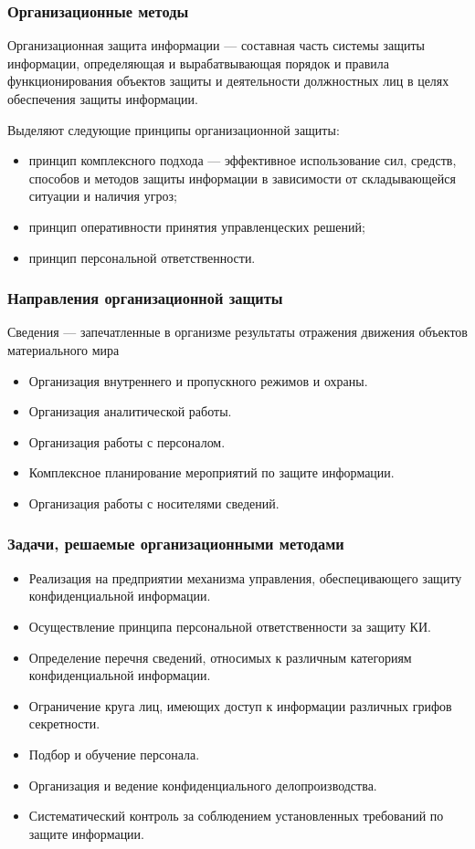 \begin{frame}
\frametitle{Организационные методы}
\begin{definition}%
\alert{Организационная защита информации} --- составная часть системы защиты информации, определяющая и вырабатвывающая порядок и правила функционирования объектов защиты и деятельности должностных лиц в целях обеспечения защиты информации.
\end{definition}
Выделяют следующие принципы организационной защиты:
\begin{itemize}
    \item принцип комплексного подхода --- эффективное использование сил, средств, способов и методов защиты информации в зависимости от складывающейся ситуации и наличия угроз;
    \item принцип оперативности принятия управленцеских решений;
    \item принцип персональной ответственности.
\end{itemize}
\end{frame}


\begin{frame}
\frametitle{Направления организационной защиты}
\begin{definition}%
    \alert{Сведения} --- запечатленные в организме результаты отражения движения объектов материального мира
\end{definition}
\begin{itemize}
    \item Организация внутреннего и пропускного режимов и охраны.
    \item Организация аналитической работы.
    \item Организация работы с персоналом.
    \item Комплексное планирование мероприятий по защите информации.
    \item Организация работы с носителями сведений.
\end{itemize}
\end{frame}


\begin{frame}
\frametitle{Задачи, решаемые организационными методами}
\begin{itemize}
    \item Реализация на предприятии механизма управления, обеспецивающего защиту конфиденциальной информации.
    \item Осуществление принципа персональной ответственности за защиту КИ.
    \item Определение перечня сведений, относимых к различным категориям конфиденциальной информации.
    \item Ограничение круга лиц, имеющих доступ к информации различных грифов секретности.
    \item Подбор и обучение персонала.
    \item Организация и ведение конфиденциального делопроизводства.
    \item Систематический контроль за соблюдением установленных требований по защите информации.
\end{itemize}
\end{frame}


